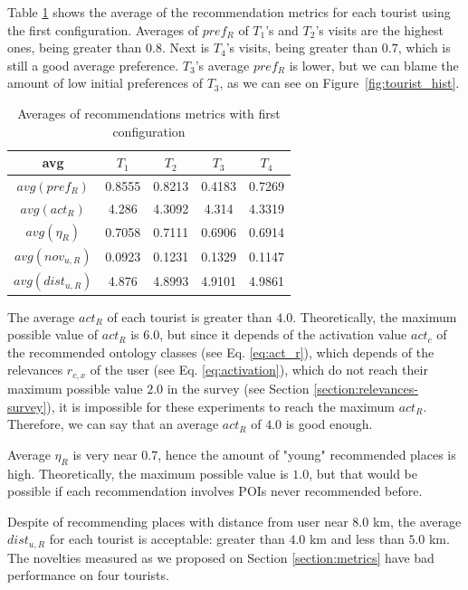 Table \ref{table:config-1} shows the average of the recommendation metrics for each tourist using the first configuration. Averages of $pref_R$ of $T_1$'s and $T_2$'s visits are the highest ones, being greater than $0.8$.
Next is $T_4$'s visits, being greater than $0.7$, which is still a good average preference. $T_3$'s average $pref_R$ is lower, but we can blame the amount of low initial preferences of $T_3$, as we can see on Figure~\ref{fig:tourist_hist}.

\begin{table}[h!]
    \centering
        \caption{Averages of recommendations metrics with first configuration}
    \label{table:config-1}
    \begin{tabular}{ |c|c|c|c|c| } 
        \hline
        avg & $T_1$ & $T_2$ & $T_3$ & $T_4$ \\
        \hline
        \hline
        $avg(pref_R)$ & 0.8555 & 0.8213 & 0.4183 & 0.7269\\
        $avg(act_R)$ & 4.286 & 4.3092 & 4.314 & 4.3319 \\
        $avg(\eta_R)$ & 0.7058 & 0.7111 & 0.6906 & 0.6914 \\
        $avg(nov_{u,R})$ & 0.0923 & 0.1231 & 0.1329 & 0.1147 \\
        $avg(dist_{u,R})$ & 4.876 & 4.8993 & 4.9101 & 4.9861 \\
       
        \hline
    \end{tabular}
\end{table}

The average $act_R$ of each tourist is greater than $4.0$. Theoretically, the maximum possible value of $act_R$ is $6.0$, but since it depends of the activation value $act_c$ of the recommended ontology classes (see Eq. \ref{eq:act_r}), which depends of  the relevances $r_{c, x}$ of the user (see Eq. \ref{eq:activation}), which do not reach their maximum possible value $2.0$ in the survey (see Section \ref{section:relevances-survey}), it is impossible for these experiments to reach the maximum $act_R$. Therefore, we can say that an average $act_R$ of $4.0$ is good enough.

Average $\eta_R$ is very near $0.7$, hence the amount of "young" recommended places is high. Theoretically, the maximum possible value is $1.0$, but that would be possible if each recommendation involves POIs never recommended before. 

Despite of recommending places with distance from user near $8.0$ km, the average $dist_{u,R}$ for each tourist is acceptable: greater than $4.0$ km and less than $5.0$ km. The novelties measured as we proposed on Section \ref{section:metrics} have bad performance on four tourists.

